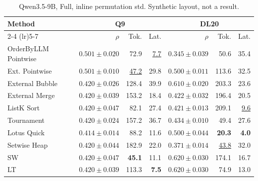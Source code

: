 \begin{table}[t]
\centering\footnotesize\setlength{\tabcolsep}{3.2pt}\renewcommand{\arraystretch}{1.12}
\caption{Qwen3.5-9B, Full, inline permutation std. Synthetic layout, not a result.}
\begin{tabular}{@{}lrrrrrr@{}}
\toprule
Method & \multicolumn{3}{c}{Q9} & \multicolumn{3}{c}{DL20} \\
\cmidrule(lr){2-4} \cmidrule(lr){5-7}
 & $\rho$ & Tok. & Lat. & $\rho$ & Tok. & Lat. \\
\midrule
OrderByLLM Pointwise & \textbf{$0.501\pm0.020$} & 72.9 & \underline{7.7} & $0.345\pm0.039$ & 50.6 & 35.4 \\
Ext. Pointwise & \underline{$0.501\pm0.010$} & \underline{47.2} & 29.8 & $0.500\pm0.011$ & 113.6 & 32.5 \\
External Bubble & $0.420\pm0.026$ & 128.4 & 39.9 & \underline{$0.610\pm0.020$} & 203.3 & 23.6 \\
External Merge & $0.420\pm0.039$ & 153.2 & 18.4 & $0.422\pm0.032$ & 196.4 & 20.5 \\
ListK Sort & $0.420\pm0.047$ & 82.1 & 27.4 & $0.421\pm0.013$ & 209.1 & \underline{9.6} \\
Tournament & $0.420\pm0.024$ & 157.2 & 36.7 & $0.434\pm0.010$ & 49.4 & 27.6 \\
Lotus Quick & $0.414\pm0.014$ & 88.2 & 11.6 & $0.500\pm0.044$ & \textbf{20.3} & \textbf{4.0} \\
Setwise Heap & $0.420\pm0.044$ & 182.9 & 22.0 & $0.371\pm0.014$ & \underline{43.8} & 32.0 \\
SW & $0.420\pm0.047$ & \textbf{45.1} & 11.1 & \textbf{$0.620\pm0.030$} & 174.1 & 16.7 \\
LT & $0.420\pm0.039$ & 113.3 & \textbf{7.5} & \textbf{$0.620\pm0.030$} & 74.9 & 13.0 \\
\bottomrule
\end{tabular}
\end{table}

